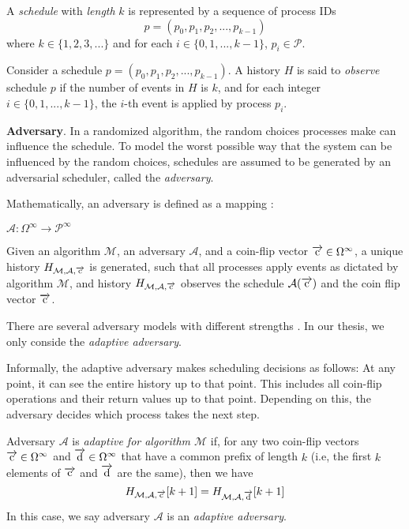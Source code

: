 A \emph{schedule} with \emph{length} $k$ is represented by a sequence of process IDs
$$p = (p_0, p_1, p_2,..., p_{k-1})$$ where $k \in \{1, 2, 3, ...\}$ and for each $i \in \{0, 1, ..., k-1\}$,
$p_i \in \mathcal{P}$.

Consider a schedule $p = (p_0, p_1, p_2,..., p_{k-1})$.
A history $H$ is said to \emph{observe} schedule $p$ if the number of events in $H$ is $k$,
and for each integer $i \in \{0, 1, ..., k-1\}$, the $i$-th event is applied by process $p_i$.

\textbf{Adversary}.
In a randomized algorithm, the random choices processes make can influence the schedule.
To model the worst possible way that the system can be influenced by the random choices,
schedules are assumed to be generated by an adversarial scheduler, called the \emph{adversary}.

Mathematically, an adversary is defined as a mapping \cite{golab2011linearizable}:
\begin{center}
$\mathcal{A} :  \Omega^{\infty} \to \mathcal{P}^{\infty}$
\end{center}

Given an algorithm $\mathcal{M}$, an adversary $\mathcal{A}$, and
a coin-flip vector $\overrightarrow{\rm c} \in \Omega^{\infty}$,
a unique history $H_{\mathcal{M},\mathcal{A}, \overrightarrow{\rm c}}$ is generated, such that all
processes apply events as dictated by algorithm $\mathcal{M}$, and history
$H_{\mathcal{M}, \mathcal{A}, \overrightarrow{\rm c}}$
observes the schedule $\mathcal{A(\overrightarrow{\rm c})}$ and the coin flip vector $\overrightarrow{\rm c}$.

There are several adversary models with different strengths \cite{DBLP:journals/corr/cs-DS-0209014}.
In our thesis, we only conside the \emph{adaptive adversary}.

Informally, the adaptive adversary makes scheduling
decisions as follows: At any point, it can see the entire history up to that point.
This includes all coin-flip operations and their return values up to that point. Depending on this,
the adversary decides which process takes the next step.

Adversary $\mathcal{A}$ is \emph{adaptive for algorithm $\mathcal{M}$} \cite{golab2011linearizable}
if, for any two coin-flip
vectors $\overrightarrow{\rm c} \in \Omega^{\infty}$ and $\overrightarrow{\rm d} \in \Omega^{\infty}$ that have a common prefix
of length $k$ (i.e, the first $k$ elements of $\overrightarrow{\rm c}$ and $\overrightarrow{\rm d}$ are the same), then we have
$$H_{\mathcal{M},\mathcal{A}, \overrightarrow{\rm c}}[k+1] = H_{\mathcal{M},\mathcal{A}, \overrightarrow{\rm d}}[k+1]$$
In this case, we say adversary $\mathcal{A}$ is an \emph{adaptive adversary}.

